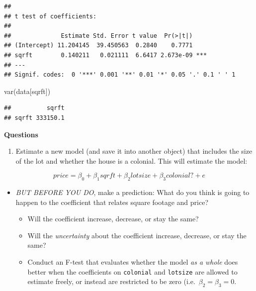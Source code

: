 \documentclass[
]{book}
\newenvironment{Shaded}{\begin{snugshade}}{\end{snugshade}}
\newcommand{\FunctionTok}[1]{\textcolor[rgb]{0.00,0.00,0.00}{#1}}
\newcommand{\NormalTok}[1]{#1}
\newcommand{\StringTok}[1]{\textcolor[rgb]{0.31,0.60,0.02}{#1}}
\providecommand{\tightlist}{%
  \setlength{\itemsep}{0pt}\setlength{\parskip}{0pt}}
\theoremstyle{definition}
\theoremstyle{definition}
\theoremstyle{definition}
\theoremstyle{definition}
\theoremstyle{remark}
\begin{document}
\begin{verbatim}
## 
## t test of coefficients:
## 
##              Estimate Std. Error t value  Pr(>|t|)    
## (Intercept) 11.204145  39.450563  0.2840    0.7771    
## sqrft        0.140211   0.021111  6.6417 2.673e-09 ***
## ---
## Signif. codes:  0 '***' 0.001 '**' 0.01 '*' 0.05 '.' 0.1 ' ' 1
\end{verbatim}

\begin{Shaded}
\begin{Highlighting}[]
\FunctionTok{var}\NormalTok{(data[}\StringTok{\textquotesingle{}sqrft\textquotesingle{}}\NormalTok{]) }
\end{Highlighting}
\end{Shaded}

\begin{verbatim}
##          sqrft
## sqrft 333150.1
\end{verbatim}

\textbf{Questions}

\begin{enumerate}
\def\labelenumi{\arabic{enumi}.}
\tightlist
\item
  Estimate a new model (and save it into another object) that includes the size of the lot and whether the house is a colonial. This will estimate the model:
\end{enumerate}

\[
  price = \beta_{0} + \beta_{1} sqrft + \beta_{2} lotsize + \beta_{3} colonial? + e
\]

\begin{itemize}
\tightlist
\item
  \emph{BUT BEFORE YOU DO}, make a prediction: What do you think is going to happen to the coefficient that relates square footage and price?

  \begin{itemize}
  \tightlist
  \item
    Will the coefficient increase, decrease, or stay the same?
  \item
    Will the \emph{uncertainty} about the coefficient increase, decrease, or stay the same?
  \item
    Conduct an F-test that evaluates whether the model \emph{as a whole} does better when the coefficients on \texttt{colonial} and \texttt{lotsize} are allowed to estimate freely, or instead are restricted to be zero (i.e.~\(\beta_{2} = \beta_{3} = 0\).
  \end{itemize}
\end{itemize}
\end{document}
